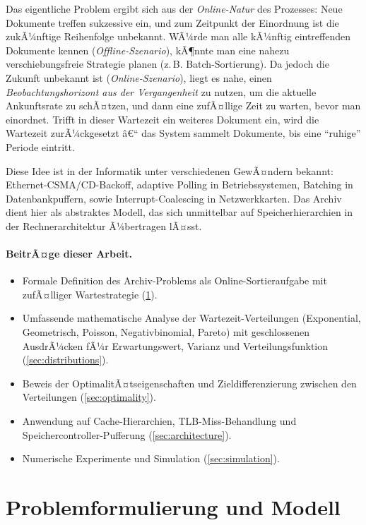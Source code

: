 ﻿\documentclass[12pt, a4paper]{article}
\begin{document}
Das eigentliche Problem ergibt sich aus der \emph{Online-Natur} des Prozesses:
Neue Dokumente treffen sukzessive ein, und zum Zeitpunkt der Einordnung ist
die zukÃ¼nftige Reihenfolge unbekannt. WÃ¼rde man alle kÃ¼nftig eintreffenden
Dokumente kennen (\emph{Offline-Szenario}), kÃ¶nnte man eine nahezu
verschiebungsfreie Strategie planen (z.\,B. Batch-Sortierung). Da jedoch die
Zukunft unbekannt ist (\emph{Online-Szenario}), liegt es nahe, einen
\emph{Beobachtungshorizont aus der Vergangenheit} zu nutzen, um die aktuelle
Ankunftsrate zu schÃ¤tzen, und dann eine zufÃ¤llige Zeit zu warten, bevor man
einordnet. Trifft in dieser Wartezeit ein weiteres Dokument ein, wird die
Wartezeit zurÃ¼ckgesetzt â€“ das System sammelt Dokumente, bis eine
``ruhige'' Periode eintritt.

Diese Idee ist in der Informatik unter verschiedenen GewÃ¤ndern bekannt:
Ethernet-CSMA/CD-Backoff, adaptive Polling in Betriebssystemen, Batching in
Datenbankpuffern, sowie Interrupt-Coalescing in Netzwerkkarten. Das Archiv
dient hier als abstraktes Modell, das sich unmittelbar auf Speicherhierarchien
in der Rechnerarchitektur Ã¼bertragen lÃ¤sst.

\paragraph{BeitrÃ¤ge dieser Arbeit.}
\begin{itemize}[noitemsep]
  \item Formale Definition des Archiv-Problems als Online-Sortieraufgabe mit
        zufÃ¤lliger Wartestrategie (\cref{sec:model}).
  \item Umfassende mathematische Analyse der Wartezeit-Verteilungen
        (Exponential, Geometrisch, Poisson, Negativbinomial, Pareto) mit
        geschlossenen AusdrÃ¼cken fÃ¼r Erwartungswert, Varianz und
        Verteilungsfunktion (\cref{sec:distributions}).
  \item Beweis der OptimalitÃ¤tseigenschaften und Zieldifferenzierung zwischen
        den Verteilungen (\cref{sec:optimality}).
  \item Anwendung auf Cache-Hierarchien, TLB-Miss-Behandlung und
        Speichercontroller-Pufferung (\cref{sec:architecture}).
  \item Numerische Experimente und Simulation (\cref{sec:simulation}).
\end{itemize}

\section{Problemformulierung und Modell}\label{sec:model}
\end{document}
